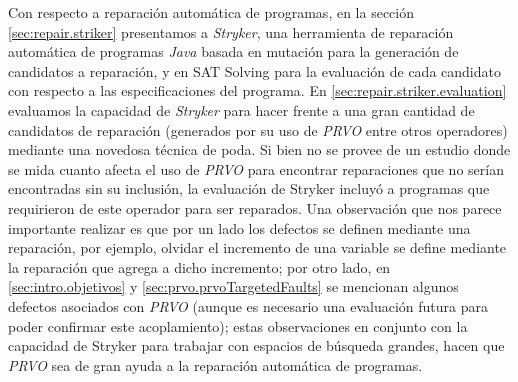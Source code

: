 Con respecto a reparaci\'on autom\'atica de programas, en la secci\'on \ref{sec:repair.striker} presentamos a \emph{Stryker}, una herramienta de reparaci\'on autom\'atica de programas \emph{Java} basada en mutaci\'on para la generaci\'on de candidatos a reparaci\'on, y en SAT Solving para la evaluaci\'on de cada candidato con respecto a las especificaciones del programa. En \ref{sec:repair.striker.evaluation} evaluamos la capacidad de \emph{Stryker} para hacer frente a una gran cantidad de candidatos de reparaci\'on (generados por su uso de \emph{PRVO} entre otros operadores) mediante una novedosa t\'ecnica de poda. Si bien no se provee de un estudio donde se mida cuanto afecta el uso de \emph{PRVO} para encontrar reparaciones que no ser\'ian encontradas sin su inclusi\'on, la evaluaci\'on de Stryker incluy\'o a programas que requirieron de este operador para ser reparados. Una observaci\'on que nos parece importante realizar es que por un lado los defectos se definen mediante una reparaci\'on, por ejemplo, olvidar el incremento de una variable se define mediante la reparaci\'on que agrega a dicho incremento; por otro lado, en \ref{sec:intro.objetivos} y \ref{sec:prvo.prvoTargetedFaults} se mencionan algunos defectos asociados con \emph{PRVO} (aunque es necesario una evaluaci\'on futura para poder confirmar este acoplamiento); estas observaciones en conjunto con la capacidad de Stryker para trabajar con espacios de b\'usqueda grandes, hacen que \emph{PRVO} sea de gran ayuda a la reparaci\'on autom\'atica de programas.